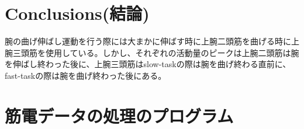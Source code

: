 \documentclass{jsarticle}
\begin{document}
%
%




\section{Conclusions(結論)}
腕の曲げ伸ばし運動を行う際には大まかに伸ばす時に上腕二頭筋を曲げる時に上腕三頭筋を使用している。しかし、それぞれの活動量のピークは上腕二頭筋は腕を伸ばし終わった後に、上腕三頭筋はslow-taskの際は腕を曲げ終わる直前に、fast-taskの際は腕を曲げ終わった後にある。

\newpage
\appendix

\section{筋電データの処理のプログラム\label{prog1}}
\end{document}
